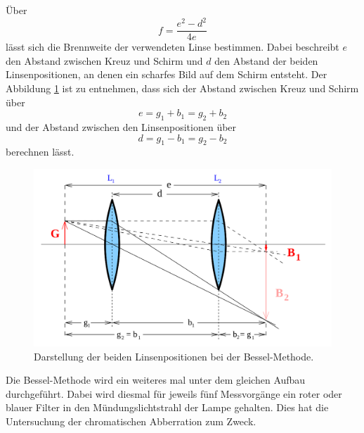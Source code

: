 Über 
\begin{equation}
    f=\frac{e^2-d^2}{4e}
    \label{eqn:besself}
\end{equation}
lässt sich die Brennweite der verwendeten Linse bestimmen. Dabei beschreibt $e$ den Abstand zwischen Kreuz und Schirm und $d$ den Abstand der beiden Linsenpositionen, an denen ein scharfes Bild auf dem Schirm entsteht.
Der Abbildung \ref{fig:Bessel} ist zu entnehmen, dass sich der Abstand zwischen Kreuz und Schirm über
\begin{equation}
    e=g_1+b_1=g_2+b_2
\end{equation}
und der Abstand zwischen den Linsenpositionen über
\begin{equation}
    d=g_1-b_1=g_2-b_2
\end{equation}
berechnen lässt.


\begin{figure}
    \centering
    \includegraphics[width=\textwidth]{data/Bessel.png}
    \caption{Darstellung der beiden Linsenpositionen bei der Bessel-Methode.}
    \label{fig:Bessel}
\end{figure}


Die Bessel-Methode wird ein weiteres mal unter dem gleichen Aufbau durchgeführt. Dabei wird diesmal für jeweils fünf Messvorgänge ein roter oder blauer Filter in den Mündungslichtstrahl der Lampe gehalten. Dies hat die Untersuchung der chromatischen Abberration zum Zweck.



